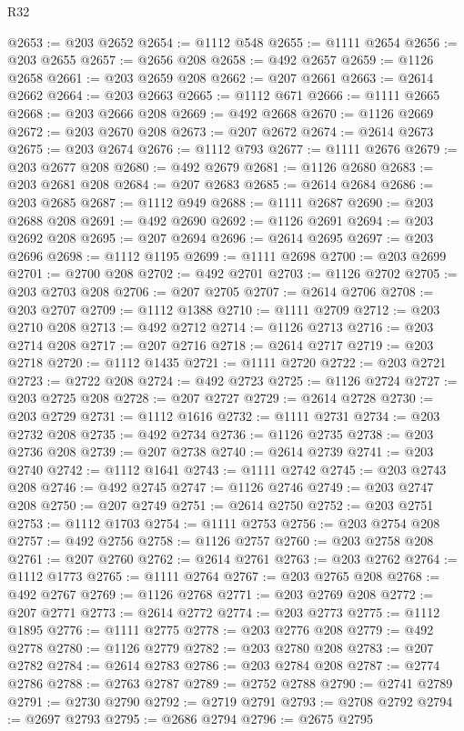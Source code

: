 \begin{lexlean}{R32}
\begin{coremodule}
@2653 := @203 @2652
@2654 := @1112 @548
@2655 := @1111 @2654
@2656 := @203 @2655
@2657 := @2656 @208
@2658 := @492 @2657
@2659 := @1126 @2658
@2661 := @203 @2659 @208
@2662 := @207 @2661
@2663 := @2614 @2662
@2664 := @203 @2663
@2665 := @1112 @671
@2666 := @1111 @2665
@2668 := @203 @2666 @208
@2669 := @492 @2668
@2670 := @1126 @2669
@2672 := @203 @2670 @208
@2673 := @207 @2672
@2674 := @2614 @2673
@2675 := @203 @2674
@2676 := @1112 @793
@2677 := @1111 @2676
@2679 := @203 @2677 @208
@2680 := @492 @2679
@2681 := @1126 @2680
@2683 := @203 @2681 @208
@2684 := @207 @2683
@2685 := @2614 @2684
@2686 := @203 @2685
@2687 := @1112 @949
@2688 := @1111 @2687
@2690 := @203 @2688 @208
@2691 := @492 @2690
@2692 := @1126 @2691
@2694 := @203 @2692 @208
@2695 := @207 @2694
@2696 := @2614 @2695
@2697 := @203 @2696
@2698 := @1112 @1195
@2699 := @1111 @2698
@2700 := @203 @2699
@2701 := @2700 @208
@2702 := @492 @2701
@2703 := @1126 @2702
@2705 := @203 @2703 @208
@2706 := @207 @2705
@2707 := @2614 @2706
@2708 := @203 @2707
@2709 := @1112 @1388
@2710 := @1111 @2709
@2712 := @203 @2710 @208
@2713 := @492 @2712
@2714 := @1126 @2713
@2716 := @203 @2714 @208
@2717 := @207 @2716
@2718 := @2614 @2717
@2719 := @203 @2718
@2720 := @1112 @1435
@2721 := @1111 @2720
@2722 := @203 @2721
@2723 := @2722 @208
@2724 := @492 @2723
@2725 := @1126 @2724
@2727 := @203 @2725 @208
@2728 := @207 @2727
@2729 := @2614 @2728
@2730 := @203 @2729
@2731 := @1112 @1616
@2732 := @1111 @2731
@2734 := @203 @2732 @208
@2735 := @492 @2734
@2736 := @1126 @2735
@2738 := @203 @2736 @208
@2739 := @207 @2738
@2740 := @2614 @2739
@2741 := @203 @2740
@2742 := @1112 @1641
@2743 := @1111 @2742
@2745 := @203 @2743 @208
@2746 := @492 @2745
@2747 := @1126 @2746
@2749 := @203 @2747 @208
@2750 := @207 @2749
@2751 := @2614 @2750
@2752 := @203 @2751
@2753 := @1112 @1703
@2754 := @1111 @2753
@2756 := @203 @2754 @208
@2757 := @492 @2756
@2758 := @1126 @2757
@2760 := @203 @2758 @208
@2761 := @207 @2760
@2762 := @2614 @2761
@2763 := @203 @2762
@2764 := @1112 @1773
@2765 := @1111 @2764
@2767 := @203 @2765 @208
@2768 := @492 @2767
@2769 := @1126 @2768
@2771 := @203 @2769 @208
@2772 := @207 @2771
@2773 := @2614 @2772
@2774 := @203 @2773
@2775 := @1112 @1895
@2776 := @1111 @2775
@2778 := @203 @2776 @208
@2779 := @492 @2778
@2780 := @1126 @2779
@2782 := @203 @2780 @208
@2783 := @207 @2782
@2784 := @2614 @2783
@2786 := @203 @2784 @208
@2787 := @2774 @2786
@2788 := @2763 @2787
@2789 := @2752 @2788
@2790 := @2741 @2789
@2791 := @2730 @2790
@2792 := @2719 @2791
@2793 := @2708 @2792
@2794 := @2697 @2793
@2795 := @2686 @2794
@2796 := @2675 @2795

\end{coremodule}
\end{lexlean}
